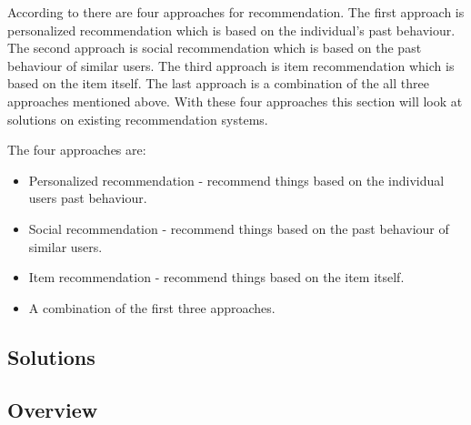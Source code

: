 According to \cite{ReadWrite} there are four approaches for recommendation. The first approach is personalized recommendation which is based on the individual’s past behaviour. The second approach is social recommendation which is based on the past behaviour of similar users. The third approach is item recommendation which is based on the item itself. The last approach is a combination of the all three approaches mentioned above. With these four approaches this section will look at solutions on existing recommendation systems.


The four approaches are:

\begin{itemize}
	\item Personalized recommendation - recommend things based on the individual users past behaviour. 
	\item Social recommendation - recommend things based on the past behaviour of similar users. 
	\item Item recommendation - recommend things based on the item itself.
	\item A combination of the first three approaches.
\end{itemize}

\subsection{Solutions}
\label{Solutions}

\subsection{Overview}
\label{SolutionOverview}
